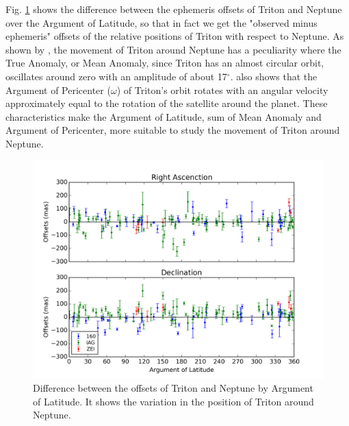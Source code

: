 \documentclass[12pt,a4paper]{report}
\newcommand{\degr}{\ensuremath{^{\circ}}}%
\begin{document}
Fig. \ref{Fig:triton-netuno-anom} shows the difference between the ephemeris offsets of Triton and Neptune over the Argument of Latitude, so that in fact we get the "observed minus ephemeris" offsets of the relative positions of Triton with respect to Neptune. As shown by \cite{Emelyanov2015}, the movement of Triton around Neptune has a peculiarity where the True Anomaly, or Mean Anomaly, since Triton has an almost circular orbit, oscillates around zero with an amplitude of about 17\degr. \cite{Emelyanov2015} also shows that the Argument of Pericenter ($\omega$) of Triton's orbit rotates with an angular velocity approximately equal to the rotation of the satellite around the planet. These characteristics make the Argument of Latitude, sum of Mean Anomaly and Argument of Pericenter, more suitable to study the movement of Triton around Neptune.

\begin{figure}[H]
\includegraphics[width=16.0cm]{Anom_TN.png} 
\caption{Difference between the offsets of Triton and Neptune by Argument of Latitude. It shows the variation in the position of Triton around Neptune.}
\label{Fig:triton-netuno-anom}
\end{figure}
\end{document}
